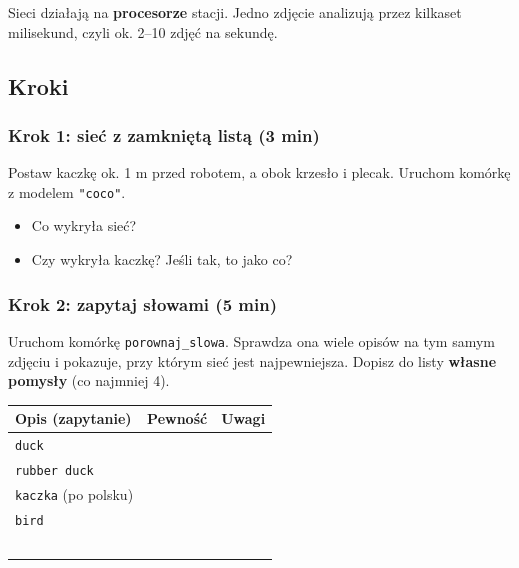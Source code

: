Sieci działają na \textbf{procesorze} stacji. Jedno zdjęcie analizują przez kilkaset milisekund, czyli ok. 2--10 zdjęć na sekundę.

\subsection{Kroki}\label{kroki}

\subsubsection{Krok 1: sieć z zamkniętą listą (3 min)}\label{krok-1-sieux107-z-zamkniux119tux105-listux105-3-min}

Postaw kaczkę ok. 1 m przed robotem, a obok krzesło i plecak. Uruchom komórkę z modelem \texttt{"coco"}.

\begin{itemize}
\tightlist
\item
  Co wykryła sieć? 
\item
  Czy wykryła kaczkę? Jeśli tak, to jako co? 
\end{itemize}

\subsubsection{Krok 2: zapytaj słowami (5 min)}\label{krok-2-zapytaj-sux142owami-5-min}

Uruchom komórkę \texttt{porownaj\_slowa}. Sprawdza ona wiele opisów na tym samym zdjęciu i pokazuje, przy którym sieć jest najpewniejsza. Dopisz do listy \textbf{własne pomysły} (co najmniej 4).

\par\noindent\begin{minipage}{\linewidth}
\begin{tabular}{@{}
  >{\raggedright\arraybackslash}p{}
  >{\raggedright\arraybackslash}p{}
  >{\raggedright\arraybackslash}p{}@{}}
\toprule\noalign{}
\begin{minipage}[b]{\linewidth}\raggedright
Opis (zapytanie)
\end{minipage} & \begin{minipage}[b]{\linewidth}\raggedright
Pewność
\end{minipage} & \begin{minipage}[b]{\linewidth}\raggedright
Uwagi
\end{minipage} \\
\midrule\noalign{}
\texttt{duck} & & \\
\texttt{rubber\ duck} & & \\
\texttt{kaczka} (po polsku) & & \\
\texttt{bird} & & \\
& & \\
& & \\
& & \\
& & \\
\bottomrule\noalign{}
\end{tabular}
\end{minipage}\par\medskip

